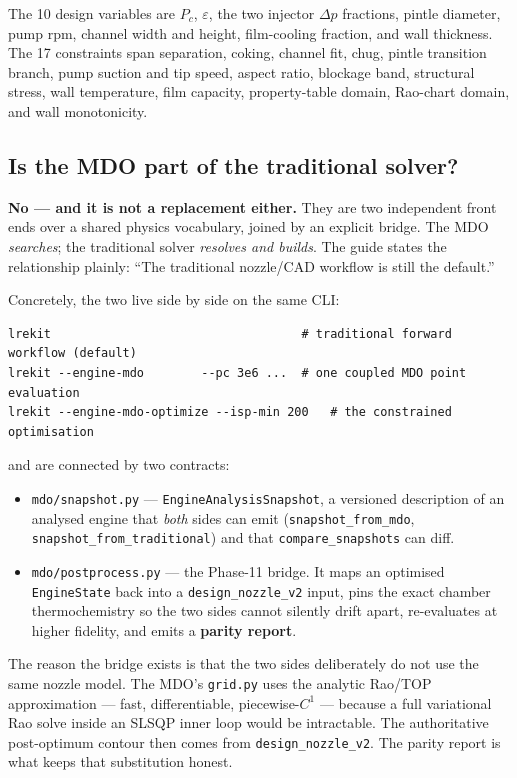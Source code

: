\documentclass[11pt]{article}
\newcommand{\cmd}[1]{\nolinkurl{#1}}
\begin{document}
The 10 design variables are $P_c$, $\varepsilon$, the two injector $\Delta p$
fractions, pintle diameter, pump rpm, channel width and height, film-cooling
fraction, and wall thickness. The 17 constraints span separation, coking,
channel fit, chug, pintle transition branch, pump suction and tip speed,
aspect ratio, blockage band, structural stress, wall temperature, film
capacity, property-table domain, Rao-chart domain, and wall monotonicity.

\subsection{Is the MDO part of the traditional solver?}

\begin{keybox}
\textbf{No --- and it is not a replacement either.} They are two independent
front ends over a shared physics vocabulary, joined by an explicit bridge.
The MDO \emph{searches}; the traditional solver \emph{resolves and builds}.
The guide states the relationship plainly: ``The traditional nozzle/CAD
workflow is still the default.''
\end{keybox}

Concretely, the two live side by side on the same CLI:
\begin{lstlisting}
lrekit                                   # traditional forward workflow (default)
lrekit --engine-mdo        --pc 3e6 ...  # one coupled MDO point evaluation
lrekit --engine-mdo-optimize --isp-min 200   # the constrained optimisation
\end{lstlisting}

and are connected by two contracts:
\begin{itemize}[leftmargin=1.4em,itemsep=2pt]
\item \cmd{mdo/snapshot.py} --- \texttt{EngineAnalysisSnapshot}, a versioned
description of an analysed engine that \emph{both} sides can emit
(\texttt{snapshot\_from\_mdo}, \texttt{snapshot\_from\_traditional}) and that
\texttt{compare\_snapshots} can diff.
\item \cmd{mdo/postprocess.py} --- the Phase-11 bridge. It maps an optimised
\texttt{EngineState} back into a \texttt{design\_nozzle\_v2} input, pins the
exact chamber thermochemistry so the two sides cannot silently drift apart,
re-evaluates at higher fidelity, and emits a \textbf{parity report}.
\end{itemize}

The reason the bridge exists is that the two sides deliberately do not use
the same nozzle model. The MDO's \cmd{grid.py} uses the analytic Rao/TOP
approximation --- fast, differentiable, piecewise-$C^1$ --- because a full
variational Rao solve inside an SLSQP inner loop would be intractable. The
authoritative post-optimum contour then comes from
\cmd{design\_nozzle\_v2}. The parity report is what keeps that substitution
honest.
\end{document}
